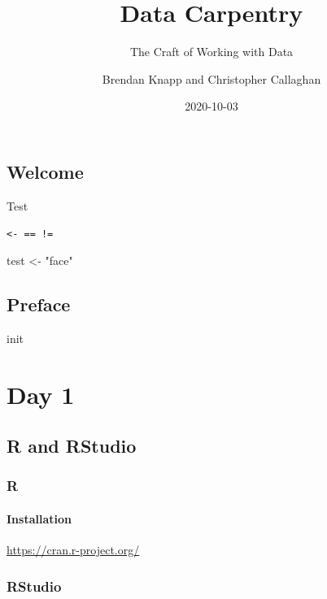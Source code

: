 \documentclass[
]{report}
\title{Data Carpentry}
\subtitle{The Craft of Working with Data}
\author{Brendan Knapp and Christopher Callaghan}
\date{2020-10-03}
\newenvironment{Shaded}{\begin{snugshade}}{\end{snugshade}}
\newcommand{\NormalTok}[1]{#1}
\newcommand{\StringTok}[1]{\textcolor[rgb]{0.31,0.60,0.02}{#1}}
\begin{document}
\maketitle

{
\setcounter{tocdepth}{4}
\tableofcontents
}
\hypertarget{welcome}{%
\chapter*{Welcome}\label{welcome}}

Test

\texttt{\textless{}-\ ==\ !=}

\begin{Shaded}
\begin{Highlighting}[]
\NormalTok{test \textless{}{-}}\StringTok{ "face"}
\end{Highlighting}
\end{Shaded}

\hypertarget{preface}{%
\chapter*{Preface}\label{preface}}

init

\cleardoublepage

\hypertarget{part-day-1}{%
\part{Day 1}\label{part-day-1}}

\hypertarget{setup-r-and-rstudio}{%
\chapter{R and RStudio}\label{setup-r-and-rstudio}}

\hypertarget{r}{%
\section{R}\label{r}}

\hypertarget{installation}{%
\subsection{Installation}\label{installation}}

\url{https://cran.r-project.org/}

\hypertarget{rstudio}{%
\section{RStudio}\label{rstudio}}
\end{document}
